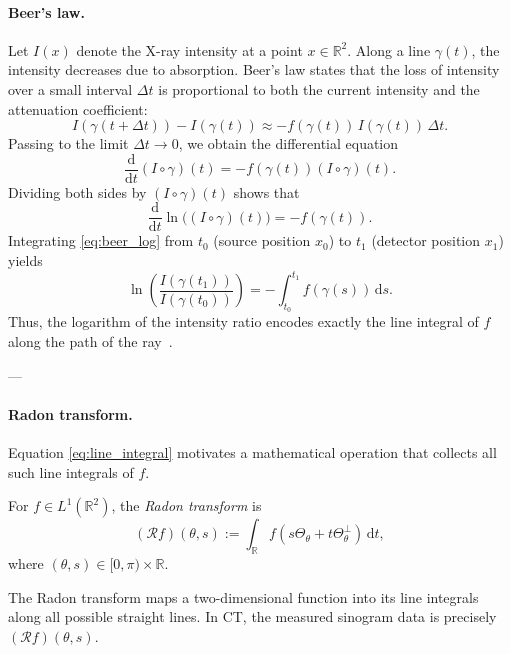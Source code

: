 \documentclass[12pt,a4paper]{article}
\begin{document}
\paragraph{Beer's law.}
Let $I(x)$ denote the X-ray intensity at a point $x \in \mathbb{R}^2$. Along a line $\gamma(t)$, the intensity decreases due to absorption. Beer's law states that the loss of intensity over a small interval $\Delta t$ is proportional to both the current intensity and the attenuation coefficient:
\[
I(\gamma(t+\Delta t)) - I(\gamma(t)) \approx -f(\gamma(t))\,I(\gamma(t))\,\Delta t.
\]
Passing to the limit $\Delta t \to 0$, we obtain the differential equation
\begin{equation}
\frac{\mathrm{d}}{\mathrm{d}t}(I\circ \gamma)(t) = -f(\gamma(t))(I\circ \gamma)(t).
\label{eq:beer}
\end{equation}
Dividing both sides by $(I\circ \gamma)(t)$ shows that
\begin{equation}
\frac{\mathrm{d}}{\mathrm{d}t} \ln\bigl((I\circ \gamma)(t)\bigr) = -f(\gamma(t)).
\label{eq:beer_log}
\end{equation}
Integrating \eqref{eq:beer_log} from $t_0$ (source position $x_0$) to $t_1$ (detector position $x_1$) yields
\begin{equation}
\ln\!\left(\frac{I(\gamma(t_1))}{I(\gamma(t_0))}\right) 
= -\int_{t_0}^{t_1} f(\gamma(s)) \,\mathrm{d}s.
\label{eq:line_integral}
\end{equation}
Thus, the logarithm of the intensity ratio encodes exactly the line integral of $f$ along the path of the ray~\cite{math_of_ct_wald}.

---

\paragraph{Radon transform.}
Equation \eqref{eq:line_integral} motivates a mathematical operation that collects all such line integrals of $f$.

\begin{definition}
For $f \in L^1(\mathbb{R}^2)$, the \emph{Radon transform} is
\begin{equation}
(\mathcal{R}f)(\theta,s) := \int_{\mathbb{R}} f(s \Theta_\theta + t \Theta_\theta^\perp)\, \mathrm{d}t,
\label{eq:radon}
\end{equation}
where $(\theta,s) \in [0,\pi)\times \mathbb{R}$.
\end{definition}
The Radon transform maps a two-dimensional function into its line integrals along all possible straight lines. In CT, the measured sinogram data is precisely $(\mathcal{R}f)(\theta,s)$.
\end{document}

